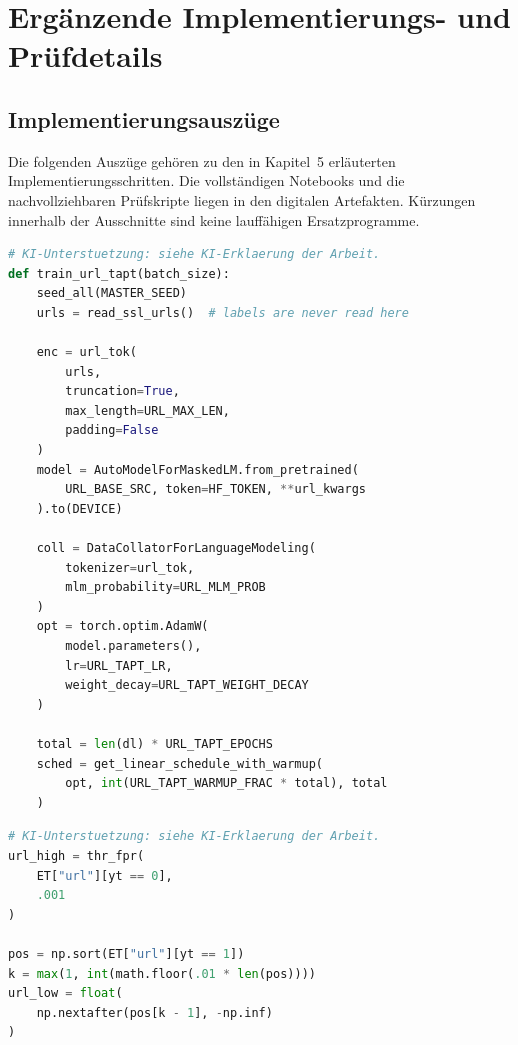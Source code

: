 \chapter{Ergänzende Implementierungs- und Prüfdetails}
\label{app:repro}
\section{Implementierungsauszüge}
Die folgenden Auszüge gehören zu den in Kapitel~5 erläuterten Implementierungsschritten.
Die vollständigen Notebooks und die nachvollziehbaren Prüfskripte liegen in den digitalen
Artefakten. Kürzungen innerhalb der Ausschnitte sind keine lauffähigen Ersatzprogramme.

\par\medskip\noindent\begin{minipage}{\dimexpr\linewidth-1em\relax}
\begin{lstlisting}[language=Python,caption={Zentraler Trainingsaufbau des URL-TAPT -- gekürzter Originalausschnitt},label={lst:url_tapt}]
# KI-Unterstuetzung: siehe KI-Erklaerung der Arbeit.
def train_url_tapt(batch_size):
    seed_all(MASTER_SEED)
    urls = read_ssl_urls()  # labels are never read here

    enc = url_tok(
        urls,
        truncation=True,
        max_length=URL_MAX_LEN,
        padding=False
    )
    model = AutoModelForMaskedLM.from_pretrained(
        URL_BASE_SRC, token=HF_TOKEN, **url_kwargs
    ).to(DEVICE)

    coll = DataCollatorForLanguageModeling(
        tokenizer=url_tok,
        mlm_probability=URL_MLM_PROB
    )
    opt = torch.optim.AdamW(
        model.parameters(),
        lr=URL_TAPT_LR,
        weight_decay=URL_TAPT_WEIGHT_DECAY
    )

    total = len(dl) * URL_TAPT_EPOCHS
    sched = get_linear_schedule_with_warmup(
        opt, int(URL_TAPT_WARMUP_FRAC * total), total
    )
\end{lstlisting}
\end{minipage}\par\medskip

\par\medskip\noindent\begin{minipage}{\dimexpr\linewidth-1em\relax}
\begin{lstlisting}[language=Python,caption={Bestimmung der Development-basierten Kaskadenschwellen},label={lst:cascade_thresholds}]
# KI-Unterstuetzung: siehe KI-Erklaerung der Arbeit.
url_high = thr_fpr(
    ET["url"][yt == 0],
    .001
)

pos = np.sort(ET["url"][yt == 1])
k = max(1, int(math.floor(.01 * len(pos))))
url_low = float(
    np.nextafter(pos[k - 1], -np.inf)
)
\end{lstlisting}
\end{minipage}\par\medskip

